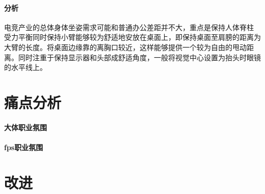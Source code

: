 \documentclass[UTF8]{ctexart}
\begin{document}
\paragraph{分析}
    电竞产业的总体身体坐姿需求可能和普通办公差距并不大，重点是保持人体脊柱
    受力平衡同时保持小臂能够较为舒适地安放在桌面上，即保持桌面至肩膀的距离为大臂的长度。将桌面边缘靠的离胸口较近，这样能够提供一个较为自由的甩动距离。同时注重于保持显示器和头部成舒适角度，一般将视觉中心设置为抬头时眼镜的水平线上。

\section{痛点分析}
\paragraph{大体职业氛围}
\paragraph{fps职业氛围}

\section{改进}
\newpage

    
\end{document}
